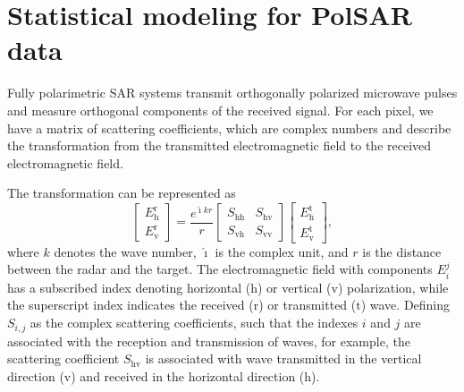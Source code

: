 \documentclass[conference]{IEEEtran}
\begin{document}
\section{Statistical modeling for PolSAR data}\label{sec_02}

Fully polarimetric SAR systems transmit orthogonally polarized microwave pulses and measure orthogonal components of the received signal. 
For each pixel, we have a matrix of scattering coefficients, which are complex numbers and describe the transformation from the transmitted electromagnetic field to the received electromagnetic field.

The transformation can be represented as
\begin{equation*}
 \left[
\begin{array}{c}
	E_{\text{h}}^{\text{r}}   \\
	E_{\text{v}}^{\text{r}}    
\end{array}
\right]
 = \frac{e^{\hat{\imath} kr}}{r}\left[
\begin{array}{cc}
	S_\text{hh}   & S_\text{hv}   \\
	S_\text{vh}   & S_{\text{vv}}   
\end{array}
\right]
 \left[
\begin{array}{c}
	E_{\text{h}}^{\text{t}}   \\
	E_{\text{v}}^{\text{t}}    
\end{array}
\right],
\end{equation*}
where $k$ denotes the wave number, $\hat{\imath}$ is the complex unit, and $r$ is the distance between the radar and the target. 
The electromagnetic field with components $E_{i}^{j}$ has a subscribed index denoting horizontal ($\text{h}$) or vertical ($\text{v}$) polarization, while the superscript index indicates the received ($\text{r}$) or transmitted ($\text{t}$) wave. 
Defining $S_{i,j}$ as the complex scattering coefficients, such that the indexes $i$ and $j$ are associated with the reception and transmission of waves, for example, the scattering coefficient $S_\text{hv}$ is associated with wave transmitted in the vertical direction ($\text{v}$) and received in the horizontal direction ($\text{h}$).
\end{document}
